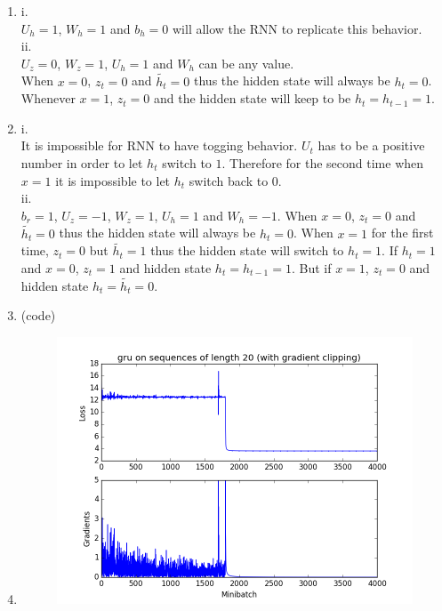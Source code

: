 \documentclass[10pt]{article}
\begin{document}
\begin{enumerate}[label=(\alph*)]
\item
i.\\
$U_h = 1$, $W_h = 1$ and $b_h = 0$ will allow the RNN to replicate this behavior.\\

ii.\\
$U_z = 0$, $W_z = 1$, $U_h = 1$ and $W_h$ can be any value.\\
When $x=0$, $z_t = 0$ and $\tilde{h_t} = 0$ thus the hidden state will always be $h_t = 0$.
Whenever $x=1$, $z_t = 0$ and the hidden state will keep to be $h_t = h_{t-1} = 1$.

\item
i.\\
It is impossible for RNN to have togging behavior.
$U_t$ has to be a positive number in order to let $h_t$ switch to $1$.
Therefore for the second time when $x = 1$ it is impossible to let $h_t$ switch back to $0$.\\

ii.\\
$b_r = 1$, $U_z = -1$, $W_z = 1$, $U_h = 1$ and $W_h = -1$.
When $x=0$, $z_t = 0$ and $\tilde{h_t} = 0$ thus the hidden state will always be $h_t = 0$.
When $x=1$ for the first time, $z_t = 0$ but $\tilde{h_t} = 1$ thus the hidden state will switch to $h_t = 1$.
If $h_t=1$ and $x=0$, $z_t = 1$ and hidden state $h_t = h_{t-1} = 1$.
But if $x=1$, $z_t = 0$ and hidden state $h_t = \tilde{h_t} = 0$.

\item
(code)

\item
\begin{figure}[h]
\center
\includegraphics[scale=0.45]{q3-clip-gru.png}
\end{figure}


\end{enumerate}
\end{document}

